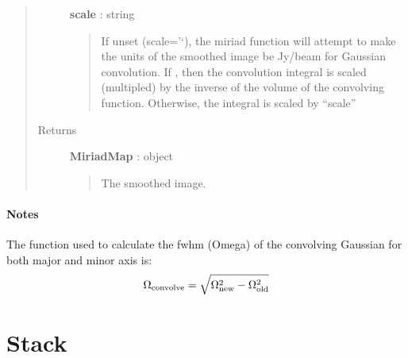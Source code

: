 \documentclass[a4paper,10pt,english]{sphinxmanual}
\begin{document}
\begin{fulllineitems}
\begin{fulllineitems}
\begin{quote}
\begin{description}
\textbf{scale} : string
\begin{quote}

If unset (scale='`), the miriad function will attempt to make the
units of the smoothed image be Jy/beam for Gaussian convolution. If
, then the convolution integral is scaled (multipled) by the
inverse of the volume of the convolving function. Otherwise, the
integral is scaled by ``scale''
\end{quote}

\item[{Returns }] \leavevmode
\textbf{MiriadMap} : object
\begin{quote}

The smoothed image.
\end{quote}

\end{description}\end{quote}
\paragraph{Notes}

The function used to calculate the fwhm (Omega) of the convolving
Gaussian for both major and minor axis is:
\begin{gather}
\begin{split}\Omega_{\rm convolve} = \sqrt{\Omega_{\rm new}^2 -
\Omega_{\rm old}^2}\end{split}\notag
\end{gather}
\end{fulllineitems}


\end{fulllineitems}



\section{Stack}
\label{maps:stack}
\end{document}
